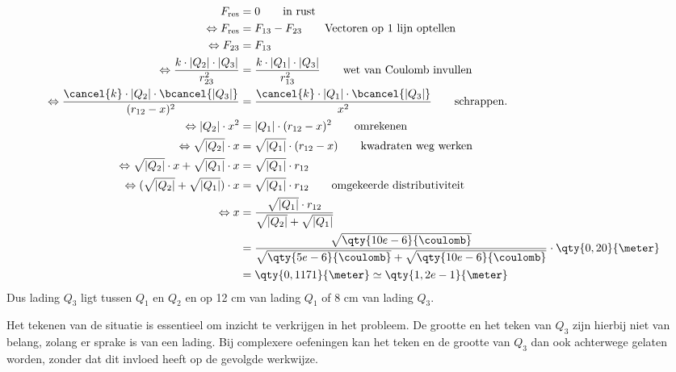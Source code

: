 \begin{voorbeeld}
            
            		\begin{align*}
            			F_{\text{res}} &= 0		\tag*{in rust}\\
            			\Leftrightarrow  F_{\text{res}} &= F_{13} - F_{23}		\tag*{Vectoren op 1 lijn optellen}\\
            			\Leftrightarrow F_{23}&=F_{13}		\\
            			\Leftrightarrow \frac{k\cdot \lvert Q_{2}\rvert \cdot \lvert Q_{3}\rvert}{r_{23}^{2}}&=\frac{k\cdot \lvert Q_{1}\rvert \cdot \lvert Q_{3}\rvert}{r_{13}^{2}}		\tag*{wet van Coulomb invullen}\\
            			\Leftrightarrow \frac{\cancel{k}\cdot \lvert Q_{2}\rvert \cdot \bcancel{\lvert Q_{3}\rvert}}{(r_{12}-x)^{2}}&=\frac{\cancel{k}\cdot \lvert Q_{1}\rvert \cdot \bcancel{\lvert Q_{3}\rvert}}{x^{2}}		\tag*{schrappen.}\\
            			\Leftrightarrow  \lvert Q_{2}\rvert \cdot x^{2}&=\lvert Q_{1}\rvert\cdot(r_{12}-x)^{2}	\tag*{omrekenen}\\
            			\Leftrightarrow  \sqrt{\lvert Q_{2}\rvert} \cdot x&=\sqrt{\lvert Q_{1}\rvert}\cdot(r_{12}-x)	\tag*{kwadraten weg werken}\\
            			\Leftrightarrow  \sqrt{\lvert Q_{2}\rvert} \cdot x + \sqrt{\lvert Q_{1}\rvert} \cdot x &=\sqrt{\lvert Q_{1}\rvert}\cdot r_{12} \\
            			\Leftrightarrow  (\sqrt{\lvert Q_{2}\rvert} + \sqrt{\lvert Q_{1}\rvert}) \cdot x &=\sqrt{\lvert Q_{1}\rvert}\cdot r_{12} 		\tag*{omgekeerde distributiviteit}\\
            			\Leftrightarrow   x &=\frac{\sqrt{\lvert Q_{1}\rvert}\cdot r_{12}}{\sqrt{\lvert Q_{2}\rvert} + \sqrt{\lvert Q_{1}\rvert}}\\
            			&=\frac{\sqrt{\qty{10e-6}{\coulomb}}}{\sqrt{\qty{5e-6}{\coulomb}}+\sqrt{\qty{10e-6}{\coulomb}}}\cdot \qty{0,20}{\meter} \\
            			&= \qty{0,1171}{\meter}\simeq \qty{1,2e-1}{\meter}
            		\end{align*}
            		Dus lading $Q_{3}$ ligt tussen $Q_{1}$ en $Q_{2}$ en op 12 cm van lading $Q_{1}$ of 8 cm van lading $Q_{3}$.\\
            		
            		\begin{opm}
            		Het tekenen van de situatie is essentieel om inzicht te verkrijgen in het probleem.
            		De grootte en het teken van $Q_{3}$ zijn hierbij niet van belang, zolang er sprake is van een lading. Bij complexere oefeningen kan het teken en de grootte van $Q_{3}$ dan ook achterwege gelaten worden, zonder dat dit invloed heeft op de gevolgde werkwijze.
            		\end{opm}
\end{voorbeeld}
